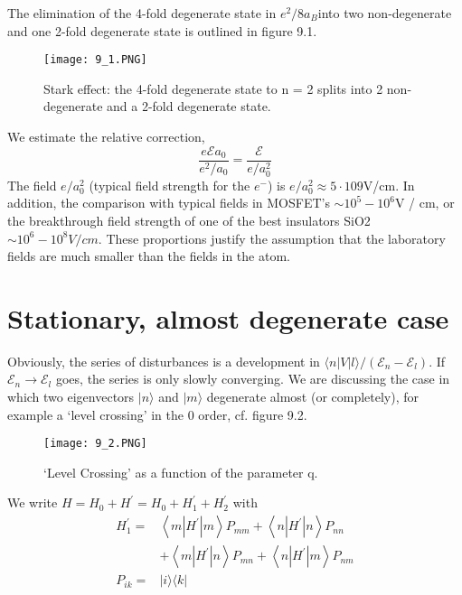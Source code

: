 The elimination of the 4-fold degenerate state in $e^2 / 8a_B $into two non-degenerate and one 2-fold degenerate state is outlined in figure 9.1.
\begin{figure}[ht]
    \begin{minipage}{0.5\textwidth}
        \centering
        \texttt{[image: 9\_1.PNG]}
    \end{minipage}
    \begin{minipage}{0.5\textwidth}
        \caption{Stark effect: the 4-fold degenerate state to n = 2 splits into 2 non-degenerate and a 2-fold degenerate state.}
    \end{minipage}
\end{figure}
We estimate the relative correction,
\begin{equation}
    \frac{e \mathcal{E} a_{0}}{e^{2} / a_{0}}=\frac{\mathcal{E}}{e / a_{0}^{2}}
    \end{equation}
The field $e / a^2_0$ (typical field strength for the $e^−$) is $e / a^2_0 \approx 5 \cdot 109 $V/cm. In addition, the comparison with typical fields in MOSFET’s $\sim 10^5 - 10^6 $V / cm, or the breakthrough field strength of one of the best insulators SiO2 $\sim 10^6 - 10^8 V / cm$. These proportions justify the assumption that the laboratory fields are much smaller than the fields in the atom.

\section{Stationary, almost degenerate case}
Obviously, the series of disturbances is a development in $\langle n|V| l\rangle /\left(\mathcal{E}_{n}-\mathcal{E}_{l}\right)$. If $\mathcal{E}_n\rightarrow\mathcal{E}_l$ goes, the series is only slowly converging. We are discussing the case in which two eigenvectors $| n\rangle$ and $| m\rangle$ degenerate almost (or completely), for example a `level crossing' in the 0 order, cf. figure 9.2.
\begin{figure}[ht]
    \begin{minipage}{0.5\textwidth}
        \centering
        \texttt{[image: 9\_2.PNG]}
    \end{minipage}
    \begin{minipage}{0.5\textwidth}
        \caption{`Level Crossing' as a function of the parameter q.}
    \end{minipage}
\end{figure}
We write $H=H_{0}+H^{\prime}=H_{0}+H_{1}^{\prime}+H_{2}^{\prime}$ with
\begin{align} H_{1}^{\prime}=&\left\langle m\left|H^{\prime}\right| m\right\rangle P_{m m}+\left\langle n\left|H^{\prime}\right| n\right\rangle P_{n n} \nonumber\\ &+\left\langle m\left|H^{\prime}\right| n\right\rangle P_{m n}+\left\langle n\left|H^{\prime}\right| m\right\rangle P_{n m} \\ P_{i k}=&|i\rangle\langle k| \end{align}

